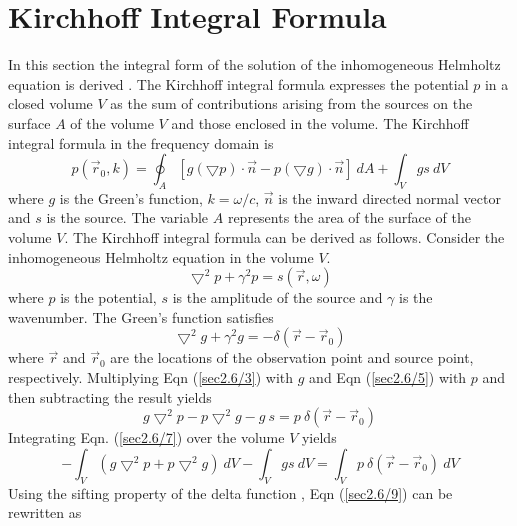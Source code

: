 \section{Kirchhoff Integral Formula}
\label{KIF}
In this section the integral form of the solution of the inhomogeneous  Helmholtz equation is derived \cite{spivack2012may}\cite{pierce1981acoustics}. 
The Kirchhoff integral formula expresses the potential $p$ in a closed 
volume $V$ as the sum of contributions arising 
from the sources on the surface  $A$ of the volume  $V$
and those enclosed in the volume.
The Kirchhoff integral formula \cite{pierce1981acoustics} in the frequency
domain is 
\begin{equation}
\label{sec2.6/1}
 p(\vec{r}_0,k ) =  \oint_{A}\left[g(\bigtriangledown p)\cdot \vec{n} -  p(\bigtriangledown g) \cdot \vec{n}    \right]~dA + \int_{V}gs ~dV
\end{equation}
where $g$ is the  Green's function, $k = \omega /c$, $\vec{n}$ is the inward directed normal vector and $s$ is the source.
The variable $A$ represents the area of the surface of the volume $V$.
The Kirchhoff integral formula can be derived as follows.
Consider the inhomogeneous Helmholtz equation in the volume $V$. 
\begin{equation}
\label{sec2.6/3}
\bigtriangledown^2p+\gamma^2p = s (\vec{r}, \omega )
\end{equation}
where  $p$ is the potential, $s $ is the amplitude of the source and $\gamma$ is the wavenumber. 
The Green's function satisfies
\begin{equation}
\label{sec2.6/5}
\bigtriangledown^2g+\gamma^2g = - \delta{(\vec{r}-\vec{r}_0)}
\end{equation}
where $\vec{r}$ and $\vec{r}_0$ are the locations of the observation point and source point, respectively. 
Multiplying Eqn (\ref{sec2.6/3}) with $g$ and Eqn (\ref{sec2.6/5}) with $p$ and then subtracting 
the result yields
\begin{equation}
\label{sec2.6/7}
  g\bigtriangledown^2p - p\bigtriangledown^2g - g\ s  = p\ \delta{(\vec{r}-\vec{r}_0)}
\end{equation}
Integrating Eqn. (\ref{sec2.6/7}) over the volume $V$ yields
\begin{equation}
\label{sec2.6/9}
-\int_{V} ({g\bigtriangledown^2p + p\bigtriangledown^2g})~dV 
-\int_{V} gs ~ dV = \int_{V} p ~\delta{(\vec{r}-\vec{r}_0)}~ dV
\end{equation}
Using the sifting property of the delta function \cite{morse1986theoretical}, Eqn (\ref{sec2.6/9}) can be rewritten as 
